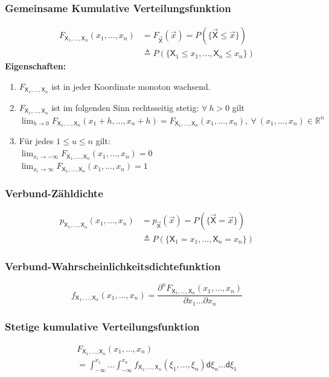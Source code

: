 \documentclass[a4paper,twocolumn,10pt]{article}
\newenvironment{iii}{\begin{enumerate}[label={\roman{*})}]}{\end{enumerate}}
\begin{document}
\subsubsection{Gemeinsame Kumulative Verteilungsfunktion}
\[\begin{split}F_{\mathsf X_1,\dots,\mathsf X_n}(x_1,\dots,x_n) & =F_{\vec{\mathsf X}}(\vec x) = P(\{\vec{\mathsf X} \leq \vec x\})\\ & \triangleq P(\{\mathsf X_1 \leq x_1, \dots, \mathsf X_n \leq x_n\})\end{split}\]
\textbf{Eigenschaften:}
\begin{iii} 
\item $F_{\mathsf X_1,\dots,\mathsf X_n}$ ist in jeder Koordinate monoton wachsend.
\item $F_{\mathsf X_1,\dots,\mathsf X_n}$ ist im folgenden Sinn rechtsseitig stetig:  $\forall\ h > 0$ gilt $\lim_{h \to 0}F_{\mathsf X_1,\dots,\mathsf X_n}(x_1 + h,\dots,x_n + h) = F_{\mathsf X_1,\dots,\mathsf X_n}(x_1,\dots,x_n),\ \forall\ (x_1,\dots,x_n) \in \mathbb R^n$
\item Für jedes $1 \leq u \leq n$ gilt:\\ $\lim_{x_i \to -\infty}F_{\mathsf X_1,\dots,\mathsf X_n}(x_1,\dots,x_n) = 0$\\$\lim_{x_i \to \infty}F_{\mathsf X_1,\dots,\mathsf X_n}(x_1,\dots,x_n) = 1$
\end{iii}

\subsubsection {Verbund-Zähldichte}
\[\begin{split}p_{\mathsf X_1,\dots,\mathsf X_n}(x_1,\dots,x_n) &=p_{\vec{\mathsf X}}(\vec x) = P(\{\vec{\mathsf X} = \vec x\})\\ &\triangleq P(\{\mathsf X_1 = x_1, \dots, \mathsf X_n = x_n\})\end{split}\]

\subsubsection{Verbund-Wahrscheinlichkeitsdichtefunktion}
\[f_{\mathsf X_1,\dots,\mathsf X_n}(x_1,\dots,x_n) = \frac{\partial^nF_{\mathsf X_1,\dots,\mathsf X_n}(x_1,\dots,x_n)}{\partial x_1\dots\partial x_n}\]

\subsubsection{Stetige kumulative Verteilungsfunktion}
\begin{gather*}
F_{\mathsf X_1,\dots,\mathsf X_n}(x_1,\dots,x_n) \\ =\int_{-\infty}^{x_1}\dots\int_{-\infty}^{x_n}f_{\mathsf X_1,\dots,\mathsf X_n}(\xi_1,\dots,\xi_n)\mathsf d\xi_n\dots\mathsf d\xi_1\end{gather*}
\end{document}
